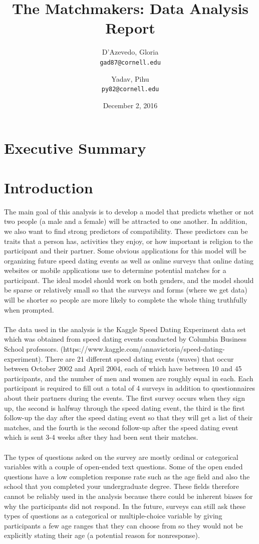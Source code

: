 \documentclass{article}
\title{The Matchmakers: Data Analysis Report}
\author{
  D'Azevedo, Gloria\\
  \texttt{gad87@cornell.edu}
  \and
  Yadav, Pihu\\
  \texttt{py82@cornell.edu}
}
\date{December 2, 2016}
\begin{document}
\maketitle

\section{Executive Summary}


\section{Introduction}
The main goal of this analysis is to develop a model that predicts whether or not two people (a male and a female) will be attracted to one another.  In addition, we also want to find strong predictors of compatibility.  These predictors can be traits that a person has, activities they enjoy, or how important is religion to the participant and their partner.  Some obvious applications for this model will be organizing future speed dating events as well as online surveys that online dating websites or mobile applications use to determine potential matches for a participant. The ideal model should work on both genders, and the model should be sparse or relatively small so that the surveys and forms (where we get data) will be shorter so people are more likely to complete the whole thing truthfully when prompted.\\
\null\\
The data used in the analysis is the Kaggle Speed Dating Experiment data set which was obtained from speed dating events conducted by Columbia Business School professors.  (https://www.kaggle.com/annavictoria/speed-dating-experiment). There are 21 different speed dating events (waves) that occur between October 2002 and April 2004, each of which have between 10 and 45 participants, and the number of men and women are roughly equal in each.  Each participant is required to fill out a total of 4 surveys in addition to questionnaires about their partners during the events.  The first survey occurs when they sign up, the second is halfway through the speed dating event, the third is the first follow-up the day after the speed dating event so that they will get a list of their matches, and the fourth is the second follow-up after the speed dating event which is sent 3-4 weeks after they had been sent their matches. \\
\null\\
The types of questions asked on the survey are mostly ordinal or categorical variables with a couple of open-ended text questions.  Some of the open ended questions have a low completion response rate such as the age field and also the school that you completed your undergraduate degree.  These fields therefore cannot be reliably used in the analysis because there could be inherent biases for why the participants did not respond. In the future, surveys can still ask these types of questions as a categorical or multiple-choice variable by giving participants a few age ranges that they can choose from so they would not be explicitly stating their age (a potential reason for nonresponse). 
%
\end{document}
